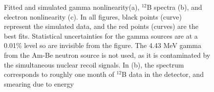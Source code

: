 \documentclass[a4paper,10pt,twoside]{cpc-hepnp}
\begin{document}
\begin{CJK*}{GB}{gbsn}
\begin{multicols}{2}
\begin{figure}[H]
  \centering 
  \caption{Fitted and simulated gamma nonlinearity(a), $^{12}$B
    spectra (b), and electron nonlinearity (c). In all figures, black
    points (curve) represent the simulated data, and the red points
    (curves) are the best fits. Statistical uncertainties for the
    gamma sources are at a 0.01\% level so are invisible from the
    figure. The 4.43 MeV gamma from the Am-Be neutron source is not
    used, as it is contaminated by the simultaneous nuclear recoil
    signals.  In (b), the spectrum corresponds to roughly one month of
    $^{12}$B data in the detector, and smearing due to energy
}
\end{figure}
\end{multicols}
\end{CJK*}
\end{document}
